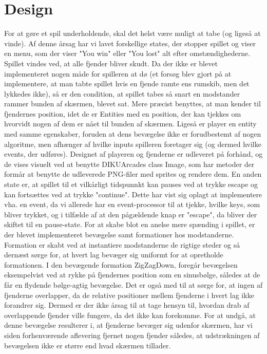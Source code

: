 \section{Design}

For at gøre et spil underholdende, skal det helst være muligt at tabe (og ligeså at vinde). Af denne årsag har vi lavet forskellige states, der stopper spillet og viser en menu, som der viser "You win" eller "You lost" alt efter omstændighederne. Spillet vindes ved, at alle fjender bliver skudt.
Da der ikke er blevet implementeret nogen måde for spilleren at dø (et forsøg blev gjort på at implementere, at man tabte spillet hvis en fjende ramte ens rumskib, men det lykkedes ikke), så er den condition, at spillet tabes så snart en modstander rammer bunden af skærmen, blevet sat. Mere præcist benyttes, at man kender til fjendernes position, idet de er Entities med en position, der kan tjekkes om hvorvidt nogen af dem er nået til bunden af skærmen. Ligeså er player en entity med samme egenskaber, foruden at dens bevægelse ikke er forudbestemt af nogen algoritme, men afhænger af hvilke inputs spilleren foretager sig (og dermed hvilke events, der udføres).
Designet af playeren og fjenderne er udleveret på forhånd, og de vises visuelt ved at benytte DIKUArcades class Image, som har metoder der formår at benytte de udleverede PNG-filer med sprites og rendere dem.
En anden state er, at spillet til et vilkårligt tidspunnkt kan pauses ved at trykke escape og kan fortsættes ved at trykke "continue". Dette har vist sig oplagt at implementere vha. en event, da vi allerede har en event-processor til at tjekke, hvilke keys, som bliver trykket, og i tilfælde af at den pågældende knap er "escape", da bliver der skiftet til en pause-state.
For at skabe blot en anelse mere spænding i spillet, er der blevet implementeret bevægelse samt formationer hos modstanderne. Formation er skabt ved at instantiere modstanderne de rigtige steder og så dernæst sørge for, at hvert lag bevæger sig uniformt for at opretholde formationen. I den bevægende formation ZigZagDown, foregår bevægelsen eksempelvist ved at rykke på fjendernes position som en sinusbølge, således at de får en flydende bølge-agtig bevægelse. Det er også med til at sørge for, at ingen af fjenderne overlapper, da de relative positioner mellem fjenderne i hvert lag ikke forandrer sig. Dermed er der ikke årsag til at tage hensyn til, hvordan drab af overlappende fjender ville fungere, da det ikke kan forekomme.
For at undgå, at denne bevægelse resulterer i, at fjenderne bevæger sig udenfor skærmen, har vi siden forhenværende aflevering fjernet nogen fjender således, at udstrækningen af bevægelsen ikke er større end hvad skærmen tillader.
